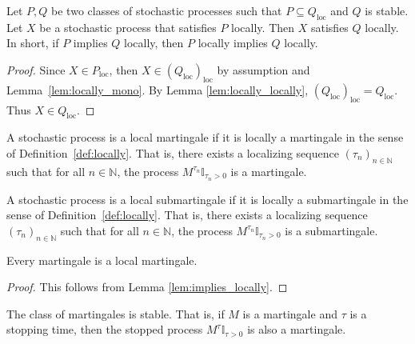 \begin{lemma}\label{lem:local_induction}
Let $P, Q$ be two classes of stochastic processes such that $P \subseteq Q_{\mathrm{loc}}$ and $Q$ is stable.
Let $X$ be a stochastic process that satisfies $P$ locally.
Then $X$ satisfies $Q$ locally.
In short, if $P$ implies $Q$ locally, then $P$ locally implies $Q$ locally.
\end{lemma}

\begin{proof}
Since $X \in P_{\mathrm{loc}}$, then $X \in (Q_{\mathrm{loc}})_{\mathrm{loc}}$ by assumption and Lemma~\ref{lem:locally_mono}.
By Lemma \ref{lem:locally_locally}, $(Q_{\mathrm{loc}})_{\mathrm{loc}} = Q_{\mathrm{loc}}$.
Thus $X \in Q_{\mathrm{loc}}$.
\end{proof}


\begin{definition}\label{def:IsLocalMartingale}
A stochastic process is a local martingale if it is locally a martingale in the sense of Definition~\ref{def:locally}.
That is, there exists a localizing sequence $(\tau_n)_{n \in \mathbb{N}}$ such that for all $n \in \mathbb{N}$, the process $M^{\tau_n}\mathbb{I}_{\tau_n > 0}$ is a martingale.
\end{definition}


\begin{definition}\label{def:IsLocalSubmartingale}
A stochastic process is a local submartingale if it is locally a submartingale in the sense of Definition~\ref{def:locally}.
That is, there exists a localizing sequence $(\tau_n)_{n \in \mathbb{N}}$ such that for all $n \in \mathbb{N}$, the process $M^{\tau_n}\mathbb{I}_{\tau_n > 0}$ is a submartingale.
\end{definition}


\begin{lemma}\label{lem:Martingale.IsLocalMartingale}
Every martingale is a local martingale.
\end{lemma}

\begin{proof}
This follows from Lemma \ref{lem:implies_locally}.
\end{proof}


\begin{lemma}\label{lem:stable_IsMartingale}
The class of martingales is stable. That is, if $M$ is a martingale and $\tau$ is a stopping time, then the stopped process $M^{\tau}\mathbb{I}_{\tau > 0}$ is also a martingale.
\end{lemma}

